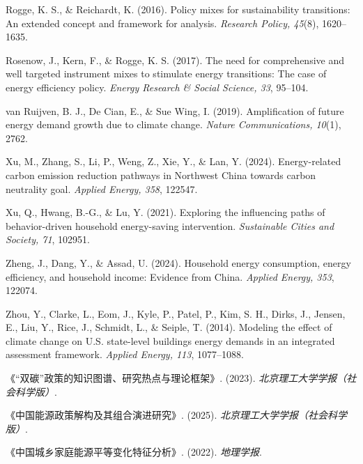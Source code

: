 \documentclass[12pt,a4paper]{ctexart}
\begin{document}
\begin{enumerate}[label={[\arabic*]}]
  \item Rogge, K. S., \& Reichardt, K. (2016). Policy mixes for sustainability transitions: An extended concept and framework for analysis. \textit{Research Policy, 45}(8), 1620--1635.
  \item Rosenow, J., Kern, F., \& Rogge, K. S. (2017). The need for comprehensive and well targeted instrument mixes to stimulate energy transitions: The case of energy efficiency policy. \textit{Energy Research \& Social Science, 33}, 95--104.
  \item van Ruijven, B. J., De Cian, E., \& Sue Wing, I. (2019). Amplification of future energy demand growth due to climate change. \textit{Nature Communications, 10}(1), 2762.
  \item Xu, M., Zhang, S., Li, P., Weng, Z., Xie, Y., \& Lan, Y. (2024). Energy-related carbon emission reduction pathways in Northwest China towards carbon neutrality goal. \textit{Applied Energy, 358}, 122547.
  \item Xu, Q., Hwang, B.-G., \& Lu, Y. (2021). Exploring the influencing paths of behavior-driven household energy-saving intervention. \textit{Sustainable Cities and Society, 71}, 102951.
  \item Zheng, J., Dang, Y., \& Assad, U. (2024). Household energy consumption, energy efficiency, and household income: Evidence from China. \textit{Applied Energy, 353}, 122074.
  \item Zhou, Y., Clarke, L., Eom, J., Kyle, P., Patel, P., Kim, S. H., Dirks, J., Jensen, E., Liu, Y., Rice, J., Schmidt, L., \& Seiple, T. (2014). Modeling the effect of climate change on U.S. state-level buildings energy demands in an integrated assessment framework. \textit{Applied Energy, 113}, 1077--1088.
  \item 《“双碳”政策的知识图谱、研究热点与理论框架》. (2023). \textit{北京理工大学学报（社会科学版）}.
  \item 《中国能源政策解构及其组合演进研究》. (2025). \textit{北京理工大学学报（社会科学版）}.
  \item 《中国城乡家庭能源平等变化特征分析》. (2022). \textit{地理学报}.
\end{enumerate}
\end{document}
